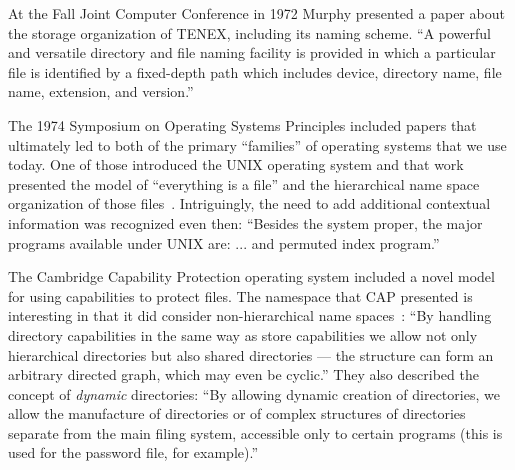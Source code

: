 

At the Fall Joint Computer Conference in 1972 Murphy presented a paper about the
storage organization of TENEX, including its naming scheme.  ``A powerful and versatile
directory and file naming facility is provided in which
a particular file is identified by a fixed-depth path which
includes device, directory name, file name, extension,
and version.''~\cite{murphy1972storage}


The 1974 Symposium on Operating Systems Principles included papers that
ultimately led to both of the primary ``families'' of operating systems that we
use today.  One of those introduced the UNIX operating system and that work
presented the model of ``everything is a file'' and the hierarchical name space
organization of those files~\cite{unix}.  Intriguingly, the need to add
additional contextual information was recognized even then: ``Besides the system
proper, the major programs available under UNIX are: ... and permuted index program.''


The Cambridge Capability Protection operating system included a novel model for
using capabilities to protect files.  The namespace that CAP presented is
interesting in that it did consider non-hierarchical name spaces~\cite{needham1977cap}: ``By handling
directory capabilities in the same way as store capabilities we allow not only
hierarchical directories but also shared directories --- the structure can form
an arbitrary directed graph, which may even be cyclic.''  They also described
the concept of \emph{dynamic} directories: ``By allowing dynamic creation of
directories, we allow the manufacture of directories or of complex structures
of directories separate from the main filing system, accessible only to certain
programs (this is used for the password file, for example).''

